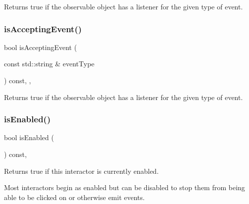 Returns true if the observable object has a listener for the given type of event. 

\mbox{\label{classsgl_1_1GObservable_a3b1c689267eda44e65a2213e7de38b23}} 
\subsubsection{\texorpdfstring{is\+Accepting\+Event()}{isAcceptingEvent()}\hspace{0.1cm}{\footnotesize\ttfamily [3/3]}}
{\footnotesize\ttfamily bool is\+Accepting\+Event (\begin{DoxyParamCaption}\item[{const std\+::string \&}]{event\+Type }\end{DoxyParamCaption}) const\hspace{0.3cm}{\ttfamily [protected]}, {\ttfamily [virtual]}, {\ttfamily [inherited]}}



Returns true if the observable object has a listener for the given type of event. 

\mbox{\label{classsgl_1_1GInteractor_aacb819fb241851fd9fc045271baa4034}} 
\subsubsection{\texorpdfstring{is\+Enabled()}{isEnabled()}}
{\footnotesize\ttfamily bool is\+Enabled (\begin{DoxyParamCaption}{ }\end{DoxyParamCaption}) const\hspace{0.3cm}{\ttfamily [virtual]}, {\ttfamily [inherited]}}



Returns true if this interactor is currently enabled. 

Most interactors begin as enabled but can be disabled to stop them from being able to be clicked on or otherwise emit events. \mbox{\label{classsgl_1_1GInteractor_a9d8a6cfb13917785c143e74d40e4e2be}} 
